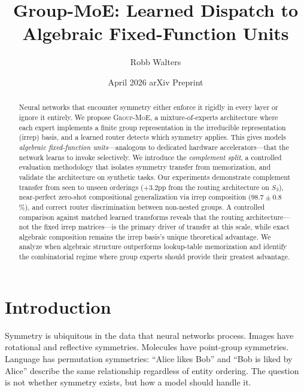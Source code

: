 \documentclass[10pt, letterpaper]{article}
\title{Group-MoE: Learned Dispatch to Algebraic Fixed-Function Units}
\author{Robb Walters}
\date{April 2026 \quad\textbar\quad arXiv Preprint}
\newcommand{\gmoe}{\textsc{Group-MoE}}
\begin{document}
\maketitle

\begin{abstract}
Neural networks that encounter symmetry either enforce it rigidly in every layer or ignore it entirely. We propose \gmoe{}, a mixture-of-experts architecture where each expert implements a finite group representation in the irreducible representation (irrep) basis, and a learned router detects which symmetry applies. This gives models \emph{algebraic fixed-function units}---analogous to dedicated hardware accelerators---that the network learns to invoke selectively. We introduce the \emph{complement split}, a controlled evaluation methodology that isolates symmetry transfer from memorization, and validate the architecture on synthetic tasks. Our experiments demonstrate complement transfer from seen to unseen orderings ($+$3.2pp from the routing architecture on $S_3$), near-perfect zero-shot compositional generalization via irrep composition ($98.7 \pm 0.8$\%), and correct router discrimination between non-nested groups. A controlled comparison against matched learned transforms reveals that the routing architecture---not the fixed irrep matrices---is the primary driver of transfer at this scale, while exact algebraic composition remains the irrep basis's unique theoretical advantage. We analyze when algebraic structure outperforms lookup-table memorization and identify the combinatorial regime where group experts should provide their greatest advantage.
\end{abstract}

\section{Introduction}
\label{sec:intro}

Symmetry is ubiquitous in the data that neural networks process. Images have rotational and reflective symmetries. Molecules have point-group symmetries. Language has permutation symmetries: ``Alice likes Bob'' and ``Bob is liked by Alice'' describe the same relationship regardless of entity ordering. The question is not whether symmetry exists, but how a model should handle it.
\end{document}
